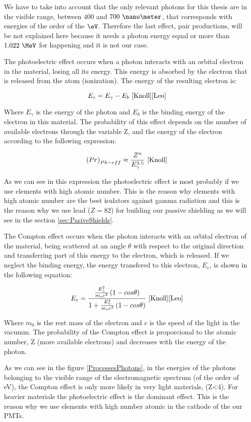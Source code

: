 We have to take into account that the only relevant photons for this thesis are in the visible range, between $400$ and $700~\nano\meter$, that corresponds with energies of the order of the $\eV$. Therefore the last effect, pair productions, will be not explained here because it needs a photon energy equal or more than $1.022~\MeV$ for happening and it is not our case.

The photoelectric effect occurs when a photon interacts with an orbital electron in the material, losing all its energy. This energy is absorbed by the electron that is released from the atom (ionization). The energy of the resulting electron is:

$$E_e = E_\gamma - E_b ~\cite{Knoll}\cite{Leo}$$

Where $E_\gamma$ is the energy of the photon and $E_b$ is the binding energy of the electron in this material. The probability of this effect depends on the number of available electrons through the variable Z, and the energy of the electron according to the following expression:

$$\left(Pr\right)_{Ph-eff} \approx \frac{Z^n}{E_\gamma^{3.5}}~\cite{Knoll}$$

As we can see in this expression the photoelectric effect is most probably if we use elements with high atomic number. This is the reason why elements with high atomic number are the best isulators against gamma radiation and this is the reason why we use lead ($Z=82$) for building our passive shielding as we will see in the section \ref{sec:PasiveShields}. 

The Compton effect occurs when the photon interacts with an orbital electron of the material, being scattered at an angle $\theta$ with respect to the original direction and transferring part of this energy to the electron, which is released. If we neglect the binding energy, the energy transfered to this electron, $E_e$, is shown in the following equation:

$$E_e=\frac{\frac{E_\gamma^2}{m_oc^2}\left(1-cos\theta\right)}{1+ \frac{E_\gamma^2}{m_oc^2}\left(1-cos\theta\right)}~\cite{Knoll}\cite{Leo}$$

Where $m_0$ is the rest mass of the electron and $c$ is the speed of the light in the vacumm. The probability of the Compton effect is proporcional to the atomic number, Z (more available electrons) and decreases with the energy of the photon. 

As we can see in the figure \ref{ProcessesPhotons}, in the energies of the photons belonging to the visible range of the electromagnetic spectrum (of the order of eV), the Compton effect is only more likely in very light materials, (Z<4). For heavier materials the photoelectric effect is the dominant effect. This is the reason why we use elements with high number atomic in the cathode of the our PMTs.

